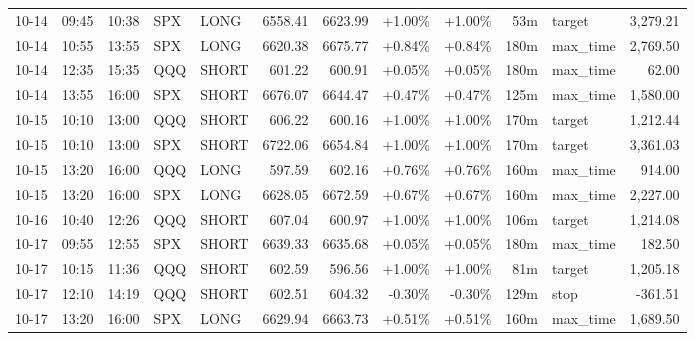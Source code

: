 \documentclass[11pt,a4paper,twoside]{article}
\begin{document}
\begin{center}
\begin{longtable}{>{\color{txtmain}}l l l l l r r r r r >{\color{txtmain}}l r}
10-14 & 09:45 & 10:38 & SPX & LONG & 6558.41 & 6623.99 & \textcolor{wingreen}{+1.00\%} & \textcolor{wingreen}{+1.00\%} & 53m & target & \textcolor{wingreen}{3,279.21} \\
10-14 & 10:55 & 13:55 & SPX & LONG & 6620.38 & 6675.77 & \textcolor{wingreen}{+0.84\%} & \textcolor{wingreen}{+0.84\%} & 180m & max\_time & \textcolor{wingreen}{2,769.50} \\
10-14 & 12:35 & 15:35 & QQQ & SHORT & 601.22 & 600.91 & \textcolor{wingreen}{+0.05\%} & \textcolor{wingreen}{+0.05\%} & 180m & max\_time & \textcolor{wingreen}{62.00} \\
10-14 & 13:55 & 16:00 & SPX & SHORT & 6676.07 & 6644.47 & \textcolor{wingreen}{+0.47\%} & \textcolor{wingreen}{+0.47\%} & 125m & max\_time & \textcolor{wingreen}{1,580.00} \\
10-15 & 10:10 & 13:00 & QQQ & SHORT & 606.22 & 600.16 & \textcolor{wingreen}{+1.00\%} & \textcolor{wingreen}{+1.00\%} & 170m & target & \textcolor{wingreen}{1,212.44} \\
10-15 & 10:10 & 13:00 & SPX & SHORT & 6722.06 & 6654.84 & \textcolor{wingreen}{+1.00\%} & \textcolor{wingreen}{+1.00\%} & 170m & target & \textcolor{wingreen}{3,361.03} \\
10-15 & 13:20 & 16:00 & QQQ & LONG & 597.59 & 602.16 & \textcolor{wingreen}{+0.76\%} & \textcolor{wingreen}{+0.76\%} & 160m & max\_time & \textcolor{wingreen}{914.00} \\
10-15 & 13:20 & 16:00 & SPX & LONG & 6628.05 & 6672.59 & \textcolor{wingreen}{+0.67\%} & \textcolor{wingreen}{+0.67\%} & 160m & max\_time & \textcolor{wingreen}{2,227.00} \\
10-16 & 10:40 & 12:26 & QQQ & SHORT & 607.04 & 600.97 & \textcolor{wingreen}{+1.00\%} & \textcolor{wingreen}{+1.00\%} & 106m & target & \textcolor{wingreen}{1,214.08} \\
10-17 & 09:55 & 12:55 & SPX & SHORT & 6639.33 & 6635.68 & \textcolor{wingreen}{+0.05\%} & \textcolor{wingreen}{+0.05\%} & 180m & max\_time & \textcolor{wingreen}{182.50} \\
10-17 & 10:15 & 11:36 & QQQ & SHORT & 602.59 & 596.56 & \textcolor{wingreen}{+1.00\%} & \textcolor{wingreen}{+1.00\%} & 81m & target & \textcolor{wingreen}{1,205.18} \\
10-17 & 12:10 & 14:19 & QQQ & SHORT & 602.51 & 604.32 & \textcolor{lossred}{-0.30\%} & \textcolor{lossred}{-0.30\%} & 129m & stop & \textcolor{lossred}{-361.51} \\
10-17 & 13:20 & 16:00 & SPX & LONG & 6629.94 & 6663.73 & \textcolor{wingreen}{+0.51\%} & \textcolor{wingreen}{+0.51\%} & 160m & max\_time & \textcolor{wingreen}{1,689.50} \\

\end{longtable}
\end{center}
\end{document}
